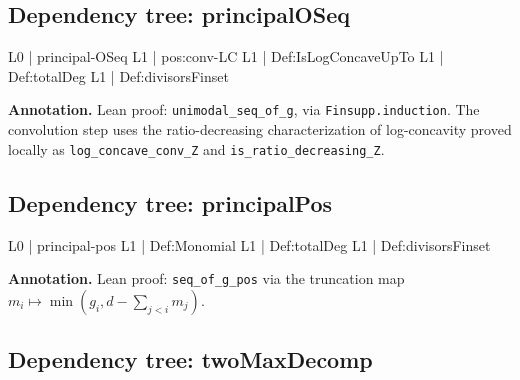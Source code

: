 \documentclass[11pt,reqno]{amsart}
\begin{document}
\medskip

\subsection*{Dependency tree: \textsf{principalOSeq}}

\noindent%
\begin{minipage}[t]{0.48\linewidth}
	\vspace{0pt}
	\begin{verbatimbox}
		L0 | principal-OSeq
		L1 |   pos:conv-LC
		L1 |   Def:IsLogConcaveUpTo
		L1 |   Def:totalDeg
		L1 |   Def:divisorsFinset
	\end{verbatimbox}
\end{minipage}\hfill 
\begin{minipage}[t]{0.48\linewidth}
	\vspace{0pt}
	\textbf{Annotation.} Lean proof: \texttt{unimodal\_seq\_of\_g}, via \texttt{Finsupp.induction}. The convolution step uses the ratio-decreasing characterization of log-concavity proved locally as \texttt{log\_concave\_conv\_Z} and \texttt{is\_ratio\_decreasing\_Z}.
\end{minipage}

\medskip

\subsection*{Dependency tree: \textsf{principalPos}}

\noindent%
\begin{minipage}[t]{0.48\linewidth}
	\vspace{0pt}
	\begin{verbatimbox}
		L0 | principal-pos
		L1 |   Def:Monomial
		L1 |   Def:totalDeg
		L1 |   Def:divisorsFinset
	\end{verbatimbox}
\end{minipage}\hfill 
\begin{minipage}[t]{0.48\linewidth}
	\vspace{0pt}
	\textbf{Annotation.} Lean proof: \texttt{seq\_of\_g\_pos} via the truncation map $m_{i}\mapsto\min(g_{i},d-\sum_{j<i}m_{j})$.
\end{minipage}

\medskip

\subsection*{Dependency tree: \textsf{twoMaxDecomp}}
\end{document}
